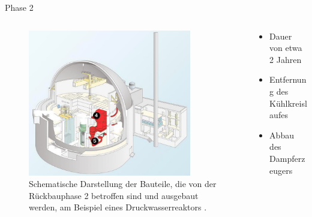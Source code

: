 \begin{frame}{Phase 2}
  \begin{columns}

    \begin{column}{0.48\textwidth}
      \begin{figure}
         \centering
         \includegraphics[width=0.85\textwidth]{./bilder/abbau_phase_2_spiegel.png}
         \caption{ Schematische Darstellung der Bauteile, die von der Rückbauphase 2 betroffen sind und ausgebaut werden, am Beispiel eines Druckwasserreaktors \cite{abbau_grafik_stade}. }
         \label{ fig: phase_2 }
       \end{figure}
     \end{column}

     \begin{column}{0.48\textwidth}
       \begin{itemize}
         \setlength\itemsep{1.2em}
        \item{ Dauer von etwa 2 Jahren}
         \item{ Entfernung des Kühlkreislaufes }
         \item{ Abbau des Dampferzeugers}
       \end{itemize}
     \end{column}

  \end{columns}
\end{frame}



